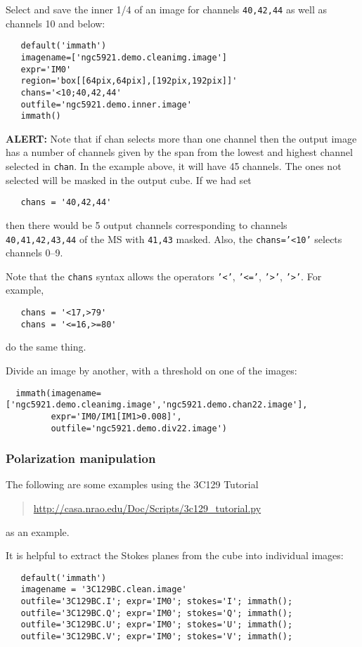 Select and save the inner 1/4 of an image for channels {\tt 40,42,44}
as well as channels 10 and below:
\small
\begin{verbatim}
   default('immath')
   imagename=['ngc5921.demo.cleanimg.image']
   expr='IM0'
   region='box[[64pix,64pix],[192pix,192pix]]'
   chans='<10;40,42,44'
   outfile='ngc5921.demo.inner.image'
   immath()
\end{verbatim}
\normalsize
{\bf ALERT:} Note that if chan selects more than one channel then
the output image has a number of channels given by the span from the
lowest and highest channel selected in {\tt chan}.  In the example 
above, it will have 45 channels.  The ones not selected will be masked
in the output cube.  If we had set
\small
\begin{verbatim}
   chans = '40,42,44'
\end{verbatim}
\normalsize
then there would be 5 output channels corresponding to channels
{\tt 40,41,42,43,44} of the MS with {\tt 41,43} masked.  Also, 
the {\tt chans='<10'} selects channels 0--9.

Note that the {\tt chans} syntax allows the operators {\tt '<'},
{\tt '<='}, {\tt '>'}, {\tt '>'}.  For example,
\small
\begin{verbatim}
   chans = '<17,>79'
   chans = '<=16,>=80'
\end{verbatim}
\normalsize
do the same thing.

Divide an image by another, with a threshold on one of the images:
\small
\begin{verbatim}
  immath(imagename=['ngc5921.demo.cleanimg.image','ngc5921.demo.chan22.image'],
         expr='IM0/IM1[IM1>0.008]',
         outfile='ngc5921.demo.div22.image')
\end{verbatim}
\normalsize

\subsubsection{Polarization manipulation}
\label{section:analysis.immath.examples.pol}

The following are some examples using the 3C129 Tutorial
\begin{quote}
  \url{http://casa.nrao.edu/Doc/Scripts/3c129_tutorial.py}
\end{quote}
as an example.

It is helpful to extract the Stokes planes from the cube
into individual images:
\small
\begin{verbatim}
   default('immath')
   imagename = '3C129BC.clean.image'
   outfile='3C129BC.I'; expr='IM0'; stokes='I'; immath();
   outfile='3C129BC.Q'; expr='IM0'; stokes='Q'; immath();
   outfile='3C129BC.U'; expr='IM0'; stokes='U'; immath();
   outfile='3C129BC.V'; expr='IM0'; stokes='V'; immath();
\end{verbatim}
\normalsize

